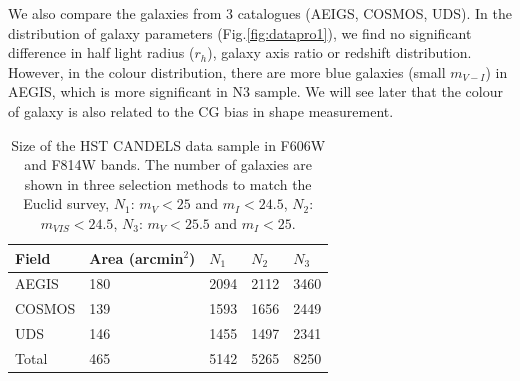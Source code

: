 \documentclass[useAMS,usenatbib]{mn2e}
\begin{document}
We also compare the galaxies from 3 catalogues (AEIGS, COSMOS, UDS).  In
the distribution of galaxy parameters (Fig.\ref{fig:datapro1}), we
find no significant difference in half light radius ($r_h$), galaxy
axis ratio or redshift distribution. However, in the colour
distribution, there are more blue galaxies (small $m_{V-I}$) in AEGIS,
which is more significant in N3 sample. We will see later that the
colour of galaxy is also related to the CG bias in shape measurement.
%
\begin{center}
\begin{table}
  \begin{tabular}{lllll}
    \hline
    Field   &Area (arcmin$^2$) &$N_1$ &$N_2$ &$N_3$\\
    \hline
    AEGIS   &180   &2094  &2112  &3460\\
    COSMOS  &139   &1593  &1656  &2449\\
    UDS     &146   &1455  &1497  &2341\\
    Total   &465   &5142  &5265  &8250\\
    \hline
  \end{tabular}
  \caption{\label{table:mag} Size of the HST CANDELS data sample in F606W
    and F814W bands.  The number of galaxies are shown in three selection
    methods to match the Euclid survey, $N_1$: $m_V<25$ and $m_I<24.5$,
    $N_2$: $m_{VIS}<24.5$, $N_3$: $m_V<25.5$ and $m_I<25$. }
\end{table}
\end{center}
%
\end{document}
